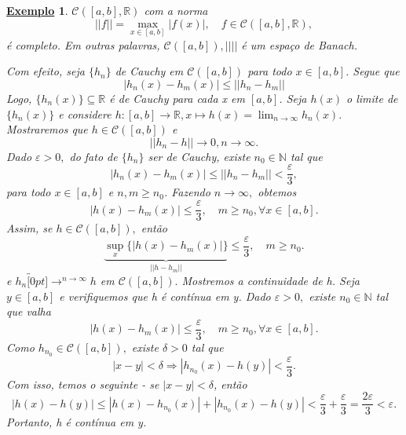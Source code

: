 \documentclass{article}
\newtheorem{example}{\underline{Exemplo}}
\begin{document}
\begin{example}
  \(\mathcal{C}([a, b], \mathbb{R})\) com a norma 
  \[
    ||f|| = \max_{x\in [a, b]}|f(x)|,\quad f\in \mathcal{C}([a, b], \mathbb{R}),
  \]
é completo. Em outras palavras, \(\mathcal{C}([a, b]), ||||\) é um espaço de Banach.

Com efeito, seja \(\{h_{n}\}\) de Cauchy em \(\mathcal{C}([a, b])\) para todo \(x\in [a, b]\). Segue que 
  \[
    |h_{n}(x) - h_{m}(x)|\leq ||h_{n}-h_{m}||
  \]
  Logo, \(\{h_{n}(x)\}\subseteq{\mathbb{R}}\) é de Cauchy para cada x em \([a, b]\). Seja \(h(x)\) o limite de \(\{h_{n}(x)\}\) e
  considere \(h:[a, b]\rightarrow \mathbb{R}, x\mapsto h(x) = \lim_{n\to \infty}h_{n}(x).\) Mostraremos que \(h\in \mathcal{C}([a, b])\) e 
    \[
      ||h_{n}-h|| \rightarrow 0, n\rightarrow \infty.
    \]
Dado \(\varepsilon >0,\) do fato de \(\{h_{n}\}\) ser de Cauchy, existe \(n_{0}\in \mathbb{N}\) tal que 
  \[
    |h_{n}(x) - h_{m}(x)|\leq ||h_{n}-h_{m}|| < \frac{\varepsilon }{3},
  \] 
para todo \(x\in[a, b]\) e \(n, m\geq n_{0}\). Fazendo \(n\longrightarrow \infty,\) obtemos 
  \[
    |h(x)-h_{m}(x)|\leq \frac{\varepsilon }{3},\quad m\geq n_{0}, \forall x\in[a, b].
  \]
  Assim, se \(h\in \mathcal{C}([a, b]), \) então 
  \[
    \underbrace{\sup_{x}\{|h(x) - h_{m}(x)|\}}_{||h-h_{m}||}\leq \frac{\varepsilon }{3},\quad m\geq n_{0}.
  \]
e \(h_{n}\overbracket[0pt]{\longrightarrow}^{n\to \infty}h\) em \(\mathcal{C}([a, b]).\) Mostremos a continuidade de h.
Seja \(y\in [a, b]\) e verifiquemos que h é contínua em y. Dado \(\varepsilon >0,\) existe \(n_{0}\in \mathbb{N}\) tal que 
valha
  \[
    |h(x)-h_{m}(x)|\leq \frac{\varepsilon }{3},\quad m\geq n_{0}, \forall x\in[a, b].
  \]
Como \(h_{n_{0}}\in \mathcal{C}([a, b]),\) existe \(\delta > 0\) tal que 
  \[
    |x-y| < \delta \Rightarrow |h_{n_{0}}(x) - h(y)| < \frac{\varepsilon }{3}.
  \]
  Com isso, temos o seguinte - se \(|x-y| < \delta \), então 
  \[
    |h(x)-h(y)|\leq |h(x)-h_{n_{0}}(x)| + |h_{n_{0}}(x) - h(y)| < \frac{\varepsilon }{3} + \frac{\varepsilon }{3} = \frac{2\varepsilon }{3} < \varepsilon .
  \]
Portanto, h é contínua em y.
\end{example}
\end{document}
